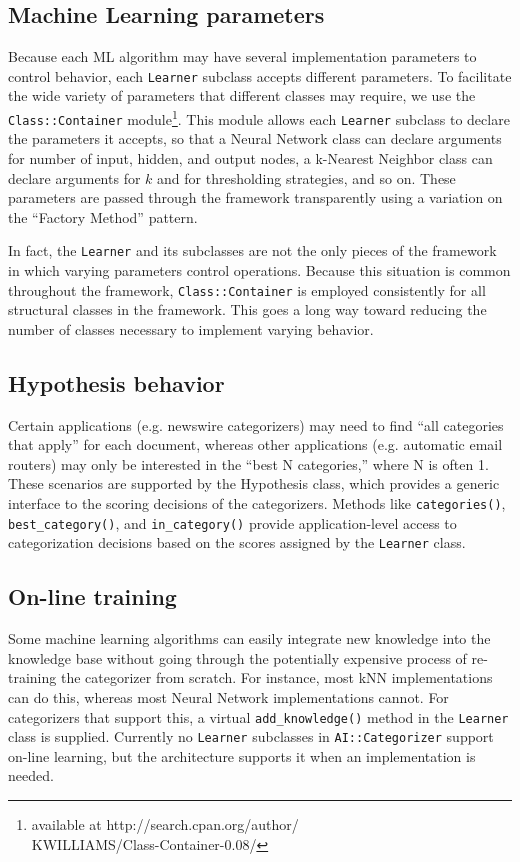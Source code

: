 \documentclass[a4paper,twocolumn]{article}
\begin{document}
\subsection*{Machine Learning parameters}
Because each ML algorithm may have several implementation parameters
to control behavior, each \texttt{Learner} subclass accepts different
parameters.  To facilitate the wide variety of parameters that
different classes may require, we use the \texttt{Class::Container}
module\footnote{available at http://search.cpan.org/author/\\
KWILLIAMS/Class-Container-0.08/}.  This module allows each
\texttt{Learner} subclass to declare the parameters it accepts, so
that a Neural Network class can declare arguments for number of input,
hidden, and output nodes, a k-Nearest Neighbor class can declare
arguments for $k$ and for thresholding strategies, and so on.  These
parameters are passed through the framework transparently using a
variation on the ``Factory Method'' pattern. \cite{gamma:95}

In fact, the \texttt{Learner} and its subclasses are not the only
pieces of the framework in which varying parameters control
operations.  Because this situation is common throughout the
framework, \texttt{Class::Container} is employed consistently for all
structural classes in the framework.  This goes a long way toward
reducing the number of classes necessary to implement varying
behavior.

\subsection*{Hypothesis behavior}
Certain applications (e.g. newswire categorizers) may need to find
``all categories that apply'' for each document, whereas other
applications (e.g. automatic email routers) may only be interested in
the ``best N categories,'' where N is often 1.  These scenarios are
supported by the Hypothesis class, which provides a generic interface
to the scoring decisions of the categorizers.  Methods like
\texttt{categories()}, \texttt{best\_category()}, and
\texttt{in\_category()} provide application-level access to
categorization decisions based on the scores assigned by the
\texttt{Learner} class.

\subsection*{On-line training}
Some machine learning algorithms can easily integrate new knowledge
into the knowledge base without going through the potentially
expensive process of re-training the categorizer from scratch.  For
instance, most kNN implementations can do this, whereas most Neural
Network implementations cannot.  For categorizers that support this, a
virtual \texttt{add\_knowledge()} method in the \texttt{Learner} class
is supplied.  Currently no \texttt{Learner} subclasses in
\texttt{AI::Categorizer} support on-line learning, but the
architecture supports it when an implementation is needed.
\end{document}
